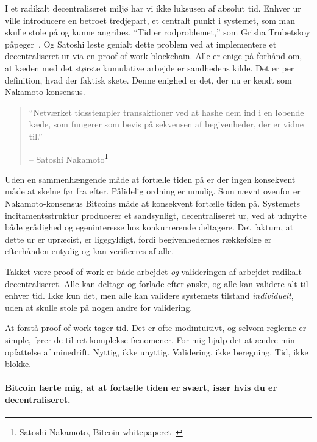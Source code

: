 I et radikalt decentraliseret miljø har vi ikke luksusen af absolut tid. Enhver ur ville introducere en betroet tredjepart, et centralt punkt i systemet, som man skulle stole på og kunne angribes. \enquote{Tid er rodproblemet,} som Grisha Trubetskoy påpeger~\cite{pow-clock}. Og Satoshi løste genialt dette problem ved at implementere et decentraliseret ur via en proof-of-work blockchain. Alle er enige på forhånd om, at kæden med det største kumulative arbejde er sandhedens kilde. Det er per definition, hvad der faktisk skete. Denne enighed er det, der nu er kendt som Nakamoto-konsensus.

\begin{quotation}\begin{samepage}
  \enquote{Netværket tidsstempler transaktioner ved at hashe dem ind i en løbende
  kæde, som fungerer som bevis på sekvensen af begivenheder, der er vidne til.}
  \begin{flushright} -- Satoshi Nakamoto\footnote{Satoshi Nakamoto, Bitcoin-whitepaperet~\cite{whitepaper}}
\end{flushright}\end{samepage}\end{quotation}
  
Uden en sammenhængende måde at fortælle tiden på er der ingen konsekvent måde at
skelne før fra efter. Pålidelig ordning er umulig. Som nævnt
ovenfor er Nakamoto-konsensus Bitcoins måde at konsekvent fortælle tiden på. Systemets incitamentsstruktur producerer et sandsynligt,
decentraliseret ur, ved at udnytte både grådighed og egeninteresse hos
konkurrerende deltagere. Det faktum, at dette ur er upræcist, er
ligegyldigt, fordi begivenhedernes rækkefølge er efterhånden entydig og kan
verificeres af alle.

Takket være proof-of-work er både arbejdet \textit{og} valideringen af arbejdet
radikalt decentraliseret. Alle kan deltage og forlade efter ønske, og
alle kan validere alt til enhver tid. Ikke kun det, men
alle kan validere systemets tilstand \textit{individuelt}, uden
at skulle stole på nogen andre for validering.

At forstå proof-of-work tager tid. Det er ofte modintuitivt,
og selvom reglerne er simple, fører de til ret komplekse fænomener.
For mig hjalp det at ændre min opfattelse af minedrift. Nyttig, ikke unyttig.
Validering, ikke beregning. Tid, ikke blokke.

\paragraph{Bitcoin lærte mig, at at fortælle tiden er svært, især hvis du er
decentraliseret.}

